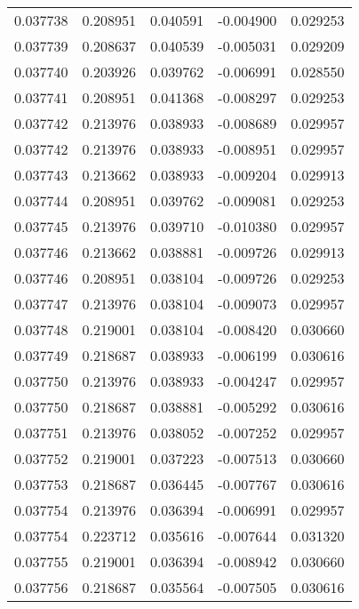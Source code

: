 \begin{tabular}{lrrrr}
0.037738    &  0.208951 &  0.040591 & -0.004900 &             0.029253 \\
0.037739    &  0.208637 &  0.040539 & -0.005031 &             0.029209 \\
0.037740    &  0.203926 &  0.039762 & -0.006991 &             0.028550 \\
0.037741    &  0.208951 &  0.041368 & -0.008297 &             0.029253 \\
0.037742    &  0.213976 &  0.038933 & -0.008689 &             0.029957 \\
0.037742    &  0.213976 &  0.038933 & -0.008951 &             0.029957 \\
0.037743    &  0.213662 &  0.038933 & -0.009204 &             0.029913 \\
0.037744    &  0.208951 &  0.039762 & -0.009081 &             0.029253 \\
0.037745    &  0.213976 &  0.039710 & -0.010380 &             0.029957 \\
0.037746    &  0.213662 &  0.038881 & -0.009726 &             0.029913 \\
0.037746    &  0.208951 &  0.038104 & -0.009726 &             0.029253 \\
0.037747    &  0.213976 &  0.038104 & -0.009073 &             0.029957 \\
0.037748    &  0.219001 &  0.038104 & -0.008420 &             0.030660 \\
0.037749    &  0.218687 &  0.038933 & -0.006199 &             0.030616 \\
0.037750    &  0.213976 &  0.038933 & -0.004247 &             0.029957 \\
0.037750    &  0.218687 &  0.038881 & -0.005292 &             0.030616 \\
0.037751    &  0.213976 &  0.038052 & -0.007252 &             0.029957 \\
0.037752    &  0.219001 &  0.037223 & -0.007513 &             0.030660 \\
0.037753    &  0.218687 &  0.036445 & -0.007767 &             0.030616 \\
0.037754    &  0.213976 &  0.036394 & -0.006991 &             0.029957 \\
0.037754    &  0.223712 &  0.035616 & -0.007644 &             0.031320 \\
0.037755    &  0.219001 &  0.036394 & -0.008942 &             0.030660 \\
0.037756    &  0.218687 &  0.035564 & -0.007505 &             0.030616 \\

\end{tabular}
